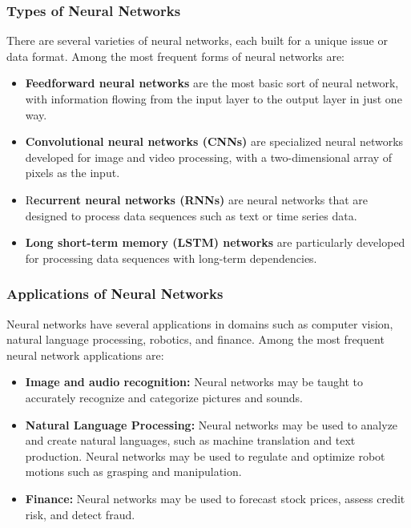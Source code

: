 \documentclass[12pt,oneside]{article}
\begin{document}
\subsubsection{Types of Neural Networks}
There are several varieties of neural networks, each built for a unique issue or data format. Among the most frequent forms of neural networks are:
\begin{itemize}
\item \textbf{Feedforward neural networks} are the most basic sort of neural network, with information flowing from the input layer to the output layer in just one way.
\item \textbf{Convolutional neural networks (CNNs)} are specialized neural networks developed for image and video processing, with a two-dimensional array of pixels as the input.
\item R\textbf{ecurrent neural networks (RNNs)} are neural networks that are designed to process data sequences such as text or time series data.
\item \textbf{Long short-term memory (LSTM) networks }are particularly developed for processing data sequences with long-term dependencies.
\end{itemize}

\subsubsection{Applications of Neural Networks}
Neural networks have several applications in domains such as computer vision, natural language processing, robotics, and finance. Among the most frequent neural network applications are:
\begin{itemize}
\item \textbf{Image and audio recognition:} Neural networks may be taught to accurately recognize and categorize pictures and sounds.
\item \textbf{Natural Language Processing:} Neural networks may be used to analyze and create natural languages, such as machine translation and text production. Neural networks may be used to regulate and optimize robot motions such as grasping and manipulation.
\item \textbf{Finance:} Neural networks may be used to forecast stock prices, assess credit risk, and detect fraud.

\end{itemize}
\end{document}
